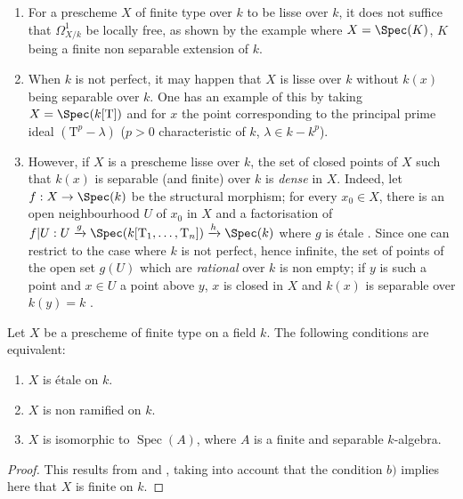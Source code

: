 \begin{remarks}[17.15.10]
\label{IV.17.15.10}
\begin{enumerate}[label=(\roman*)]
  \item For a prescheme $X$ of finite type over $k$ to be lisse over $k$, it does not suffice that $\Omega^1_{X/k}$ be locally free, as shown by the example where $X=\Spec(K)$, $K$ being a finite non separable extension of $k$.
  \item When $k$ is not perfect, it may happen that $X$ is lisse over $k$ without $k(x)$ being separable over $k$.
  One has an example of this by taking $X=\Spec(k[\mathrm{T}])$ and for $x$ the point corresponding to the principal prime ideal $(\mathrm{T}^p-\lambda)$ ($p>0$ characteristic of $k$, $\lambda\in k-k^p$).
  \item However, if $X$ is a prescheme lisse over $k$, the set of closed points of $X$ such that $k(x)$ is separable (and finite) over $k$ is \emph{dense} in $X$.
  Indeed, let $f:X\to\Spec(k)$ be the structural morphism; for every $x_0\in X$, there is an open neighbourhood $U$ of $x_0$ in $X$ and a factorisation of $f|U:U\xrightarrow{g}\Spec(k[\mathrm{T}_1,\ldots,\mathrm{T}_n])\xrightarrow{h}\Spec(k)$ where $g$ is \'etale .
  Since one can restrict to the case where $k$ is not perfect, hence infinite, the set of points of the open set $g(U)$ which are \emph{rational} over $k$ is non empty; if $y$ is such a point and $x\in U$ a point above $y$, $x$ is closed in $X$ and $k(x)$ is separable over $k(y)=k$ .
\end{enumerate}
\end{remarks}

\begin{proposition}[17.15.11]
\label{IV.17.15.11}
Let $X$ be a prescheme of finite type on a field $k$.
The following conditions are equivalent:
\begin{enumerate}
  \item[a)] $X$ is \'etale on $k$.
  \item[b)] $X$ is non ramified on $k$.
  \item[c)] $X$ is isomorphic to $\operatorname{Spec}(A)$, where $A$ is a finite and separable $k$-algebra.
\end{enumerate}
\end{proposition}

\begin{proof}
This results from  and , taking into account that the condition $b)$ implies here that $X$ is finite on $k$.
\end{proof}

